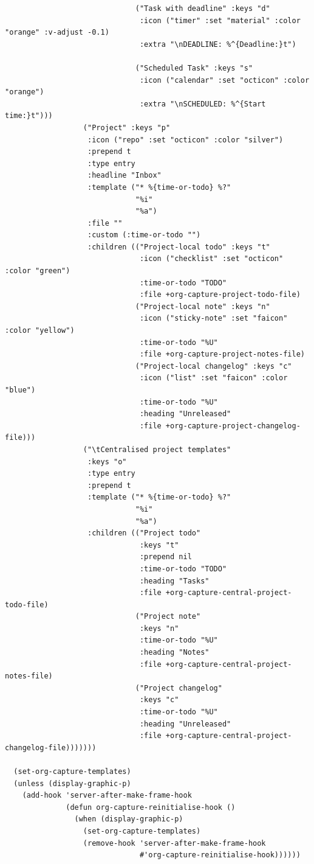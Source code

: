 \documentclass[11pt]{article}
\begin{document}
\begin{verbatim}
                              ("Task with deadline" :keys "d"
                               :icon ("timer" :set "material" :color "orange" :v-adjust -0.1)
                               :extra "\nDEADLINE: %^{Deadline:}t")

                              ("Scheduled Task" :keys "s"
                               :icon ("calendar" :set "octicon" :color "orange")
                               :extra "\nSCHEDULED: %^{Start time:}t")))
                  ("Project" :keys "p"
                   :icon ("repo" :set "octicon" :color "silver")
                   :prepend t
                   :type entry
                   :headline "Inbox"
                   :template ("* %{time-or-todo} %?"
                              "%i"
                              "%a")
                   :file ""
                   :custom (:time-or-todo "")
                   :children (("Project-local todo" :keys "t"
                               :icon ("checklist" :set "octicon" :color "green")
                               :time-or-todo "TODO"
                               :file +org-capture-project-todo-file)
                              ("Project-local note" :keys "n"
                               :icon ("sticky-note" :set "faicon" :color "yellow")
                               :time-or-todo "%U"
                               :file +org-capture-project-notes-file)
                              ("Project-local changelog" :keys "c"
                               :icon ("list" :set "faicon" :color "blue")
                               :time-or-todo "%U"
                               :heading "Unreleased"
                               :file +org-capture-project-changelog-file)))
                  ("\tCentralised project templates"
                   :keys "o"
                   :type entry
                   :prepend t
                   :template ("* %{time-or-todo} %?"
                              "%i"
                              "%a")
                   :children (("Project todo"
                               :keys "t"
                               :prepend nil
                               :time-or-todo "TODO"
                               :heading "Tasks"
                               :file +org-capture-central-project-todo-file)
                              ("Project note"
                               :keys "n"
                               :time-or-todo "%U"
                               :heading "Notes"
                               :file +org-capture-central-project-notes-file)
                              ("Project changelog"
                               :keys "c"
                               :time-or-todo "%U"
                               :heading "Unreleased"
                               :file +org-capture-central-project-changelog-file)))))))

  (set-org-capture-templates)
  (unless (display-graphic-p)
    (add-hook 'server-after-make-frame-hook
              (defun org-capture-reinitialise-hook ()
                (when (display-graphic-p)
                  (set-org-capture-templates)
                  (remove-hook 'server-after-make-frame-hook
                               #'org-capture-reinitialise-hook))))))
\end{verbatim}
\end{document}
